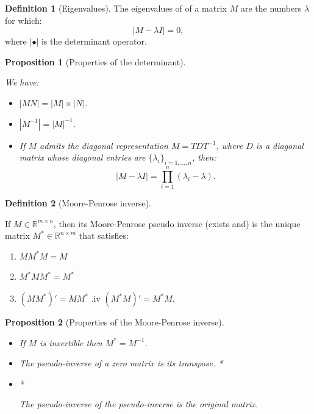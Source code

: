 \documentclass[
]{book}
\providecommand{\tightlist}{%
  \setlength{\itemsep}{0pt}\setlength{\parskip}{0pt}}
\newtheorem{proposition}{Proposition}[chapter]
\theoremstyle{definition}
\newtheorem{definition}{Definition}[chapter]
\theoremstyle{definition}
\theoremstyle{definition}
\theoremstyle{definition}
\theoremstyle{remark}
\begin{document}
\begin{definition}[Eigenvalues]
\protect\hypertarget{def:determinant}{}\label{def:determinant}The eigenvalues of of a matrix \(M\) are the numbers \(\lambda\) for which:
\[
|M - \lambda I| = 0,
\]
where \(| \bullet |\) is the determinant operator.
\end{definition}

\begin{proposition}[Properties of the determinant]
\protect\hypertarget{prp:determinant}{}\label{prp:determinant}

We have:

\begin{itemize}
\tightlist
\item
  \(|MN|=|M|\times|N|\).
\item
  \(|M^{-1}|=|M|^{-1}\).
\item
  If \(M\) admits the diagonal representation \(M=TDT^{-1}\), where \(D\) is a diagonal matrix whose diagonal entries are \(\{\lambda_i\}_{i=1,\dots,n}\), then:
  \[
  |M - \lambda I |=\prod_{i=1}^n (\lambda_i - \lambda).
  \]
\end{itemize}

\end{proposition}

\begin{definition}[Moore-Penrose inverse]
\protect\hypertarget{def:MoorPenrose}{}\label{def:MoorPenrose}

If \(M \in \mathbb{R}^{m \times n}\), then its Moore-Penrose pseudo inverse (exists and) is the unique matrix \(M^* \in \mathbb{R}^{n \times m}\) that satisfies:

\begin{enumerate}
\def\labelenumi{\roman{enumi}.}
\tightlist
\item
  \(M M^* M = M\)
\item
  \(M^* M M^* = M^*\)
\item
  \((M M^*)'=M M^*\)
  .iv \((M^* M)'=M^* M\).
\end{enumerate}

\end{definition}

\begin{proposition}[Properties of the Moore-Penrose inverse]
\protect\hypertarget{prp:MoorPenrose}{}\label{prp:MoorPenrose}

\begin{itemize}
\tightlist
\item
  If \(M\) is invertible then \(M^* = M^{-1}\).
\item
  The pseudo-inverse of a zero matrix is its transpose.
  *

  \item*

  The pseudo-inverse of the pseudo-inverse is the original matrix.
\end{itemize}

\end{proposition}
\end{document}
